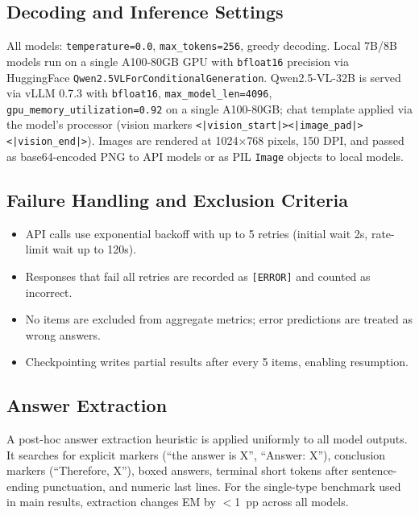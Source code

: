 \documentclass{article}
\begin{document}
\subsection{Decoding and Inference Settings}
All models: \texttt{temperature=0.0}, \texttt{max\_tokens=256}, greedy decoding. Local 7B/8B models run on a single A100-80GB GPU with \texttt{bfloat16} precision via HuggingFace \texttt{Qwen2.5VLForConditionalGeneration}. Qwen2.5-VL-32B is served via vLLM 0.7.3 with \texttt{bfloat16}, \texttt{max\_model\_len=4096}, \texttt{gpu\_memory\_utilization=0.92} on a single A100-80GB; chat template applied via the model's processor (vision markers \texttt{<|vision\_start|><|image\_pad|><|vision\_end|>}). Images are rendered at 1024$\times$768 pixels, 150 DPI, and passed as base64-encoded PNG to API models or as PIL \texttt{Image} objects to local models.

\subsection{Failure Handling and Exclusion Criteria}
\begin{itemize}[leftmargin=1.5em]
    \item API calls use exponential backoff with up to 5 retries (initial wait 2s, rate-limit wait up to 120s).
    \item Responses that fail all retries are recorded as \texttt{[ERROR]} and counted as incorrect.
    \item No items are excluded from aggregate metrics; error predictions are treated as wrong answers.
    \item Checkpointing writes partial results after every 5 items, enabling resumption.
\end{itemize}

\subsection{Answer Extraction}
A post-hoc answer extraction heuristic is applied uniformly to all model outputs. It searches for explicit markers (``the answer is X'', ``Answer: X''), conclusion markers (``Therefore, X''), boxed answers, terminal short tokens after sentence-ending punctuation, and numeric last lines. For the single-type benchmark used in main results, extraction changes EM by $<$1~pp across all models.
\end{document}
